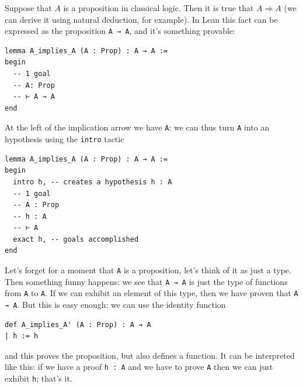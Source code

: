 \documentclass[oneside]{book}
\theoremstyle{definition}
\theoremstyle{remark}
\theoremstyle{plain}
\begin{document}
Suppose that $A$ is a proposition in classical logic.
Then it is true that $A \Rightarrow A$ (we can derive it using natural deduction, for example).
In Lean this fact can be expressed as the proposition \lstinline{A → A}, and it's something provable:
\begin{lstlisting}
lemma A_implies_A (A : Prop) : A → A :=
begin
  -- 1 goal
  -- A: Prop
  -- ⊢ A → A
end
\end{lstlisting}
At the left of the implication arrow we have \lstinline{A}:
we can thus turn \lstinline{A} into an hypothesis using the \lstinline{intro} tactic
\begin{lstlisting}
lemma A_implies_A (A : Prop) : A → A :=
begin
  intro h, -- creates a hypothesis h : A
  -- 1 goal
  -- A : Prop
  -- h : A
  -- ⊢ A
  exact h, -- goals accomplished
end
\end{lstlisting}
Let's forget for a moment that \lstinline{A} is a proposition, let's think of it as just a type.
Then something funny happens: we see that \lstinline{A → A} is just the type of functions from \lstinline{A} to \lstinline{A}.
If we can exhibit an element of this type, then we have proven that \lstinline{A → A}.
But this is easy enough: we can use the identity function
\begin{lstlisting}
def A_implies_A' (A : Prop) : A → A
| h := h    
\end{lstlisting}
and this proves the proposition, but also defines a function.
It can be interpreted like this:
if we have a proof \lstinline{h : A} and we have to prove \lstinline{A} then we can just exhibit \lstinline{h}; that's it.
\end{document}
